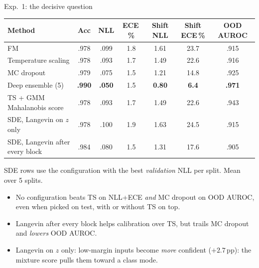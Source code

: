 \documentclass[aspectratio=169,11pt]{beamer}
\begin{document}
\begin{frame}{Exp.~1: the decisive question}
  \footnotesize
  \centering
  \begin{tabular}{@{}lcccccc@{}}
    \toprule
    Method & Acc & NLL & ECE\,\% & Shift NLL & Shift ECE\,\% & OOD AUROC\\
    \midrule
    FM & .978 & .099 & 1.8 & 1.61 & 23.7 & .915\\
    Temperature scaling & .978 & .093 & 1.7 & 1.49 & 22.6 & .916\\
    MC dropout & .979 & .075 & 1.5 & 1.21 & 14.8 & .925\\
    Deep ensemble (5) & \textbf{.990} & \textbf{.050} & 1.5 & \textbf{0.80} & \textbf{6.4} & \textbf{.971}\\
    TS + GMM Mahalanobis score & .978 & .093 & 1.7 & 1.49 & 22.6 & .943\\
    \midrule
    SDE, Langevin on $z$ only & .978 & .100 & 1.9 & 1.63 & 24.5 & .915\\
    SDE, Langevin after every block & .984 & .080 & 1.5 & 1.31 & 17.6 & .905\\
    \bottomrule
  \end{tabular}
  \par\smallskip
  \raggedright
  SDE rows use the configuration with the best \emph{validation} NLL per split. Mean over 5 splits.
  \begin{itemize}
    \item \alert{No configuration} beats TS on NLL+ECE \emph{and} MC dropout on OOD AUROC, even when picked on test, with or without TS on top.
    \item Langevin after every block helps calibration over TS, but trails MC dropout and \emph{lowers} OOD AUROC.
    \item Langevin on $z$ only: low-margin inputs become \emph{more} confident ($+2.7$\,pp): the mixture score pulls them toward a class mode.
  \end{itemize}
\end{frame}
\end{document}
